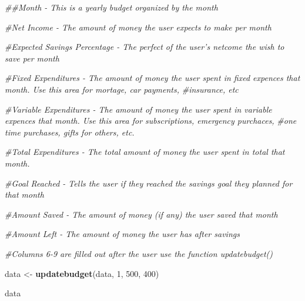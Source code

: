 \documentclass[
]{article}
\newenvironment{Shaded}{\begin{snugshade}}{\end{snugshade}}
\newcommand{\CommentTok}[1]{\textcolor[rgb]{0.56,0.35,0.01}{\textit{#1}}}
\newcommand{\DecValTok}[1]{\textcolor[rgb]{0.00,0.00,0.81}{#1}}
\newcommand{\KeywordTok}[1]{\textcolor[rgb]{0.13,0.29,0.53}{\textbf{#1}}}
\newcommand{\NormalTok}[1]{#1}
\newcommand{\StringTok}[1]{\textcolor[rgb]{0.31,0.60,0.02}{#1}}
\begin{document}
\begin{Shaded}
\begin{Highlighting}[]
\CommentTok{##Month - This is a yearly budget organized by the month}

\CommentTok{#Net Income - The amount of money the user expects to make per month}

\CommentTok{#Expected Savings Percentage - The perfect of the user's netcome the wish to save per month}

\CommentTok{#Fixed Expenditures - The amount of money the user spent in fixed expences that month. Use this area for mortage, car payments,}
\CommentTok{#insurance, etc}

\CommentTok{#Variable Expenditures - The amount of money the user spent in variable expences that month. Use this area for subscriptions, emergency purchaces,}
\CommentTok{#one time purchases, gifts for others, etc.}

\CommentTok{#Total Expenditures - The total amount of money the user spent in total that month.}

\CommentTok{#Goal Reached - Tells the user if they reached the savings goal they planned for that month}

\CommentTok{#Amount Saved - The amount of money (if any) the user saved that month}

\CommentTok{#Amount Left - The amount of money the user has after savings}

\CommentTok{#Columns 6-9 are filled out after the user use the function updatebudget()}


\NormalTok{data <-}\StringTok{ }\KeywordTok{updatebudget}\NormalTok{(data, }\DecValTok{1}\NormalTok{, }\DecValTok{500}\NormalTok{, }\DecValTok{400}\NormalTok{)}

\NormalTok{data}
\end{Highlighting}
\end{Shaded}
\end{document}
